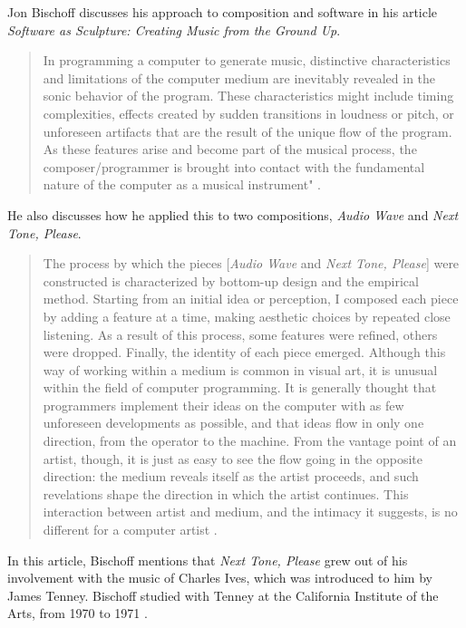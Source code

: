 \documentclass[letterpaper, 12pt]{article}
\begin{document}
%
Jon Bischoff discusses his approach to composition and software in his article \textit{Software as Sculpture: Creating Music from the Ground Up}.
%
\begin{quote}
In programming a computer to generate music, distinctive characteristics and limitations of the computer medium
are inevitably revealed in the sonic behavior of the program.
These characteristics might include timing complexities,
effects created by sudden transitions in loudness or pitch,
or unforeseen artifacts that are the result of the unique flow
of the program. As these features arise and become part of
the musical process, the composer/programmer is brought
into contact with the fundamental nature of the computer
as a musical instrument" \citep{bischoff1991software}.
\end{quote}
%
He also discusses how he applied this to two compositions, \textit{Audio Wave} and \textit{Next Tone, Please}.
\begin{quote}
The process by which the pieces [\textit{Audio Wave} and \textit{Next Tone, Please}] were constructed is characterized by
bottom-up design and the empirical method. Starting from
an initial idea or perception, I composed each piece by
adding a feature at a time, making aesthetic choices by
repeated close listening. As a result of this process, some
features were refined, others were dropped. Finally, the
identity of each piece emerged. Although this way of working within a medium is common in visual art, it is unusual
within the field of computer programming. It is generally
thought that programmers implement their ideas on the
computer with as few unforeseen developments as possible,
and that ideas flow in only one direction, from the operator
to the machine. From the vantage point of an artist, though,
it is just as easy to see the flow going in the opposite direction: the medium reveals itself as the artist proceeds, and
such revelations shape the direction in which the artist
continues. This interaction between artist and medium, and
the intimacy it suggests, is no different for a computer artist \citep{bischoff1991software}.
\end{quote}
%
In this article, Bischoff mentions that \textit{Next Tone, Please} grew out of his involvement with the music of Charles
Ives, which was introduced to him by James Tenney.
%
Bischoff studied with Tenney at the California Institute of the Arts, 
from 1970 to 1971 \citep{bischoff1991software}.
\end{document}
